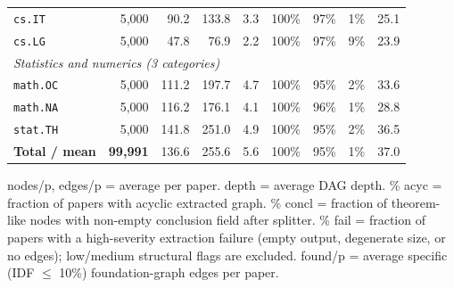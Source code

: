 \begin{table}[h]
\begin{tabular}{@{}lrrrrrrrr@{}}
\texttt{cs.IT} & 5{,}000 & 90.2 & 133.8 & 3.3 & 100\% & 97\% & 1\% & 25.1 \\
\texttt{cs.LG} & 5{,}000 & 47.8 & 76.9 & 2.2 & 100\% & 97\% & 9\% & 23.9 \\
\midrule
\multicolumn{9}{l}{\textit{Statistics and numerics (3 categories)}} \\
\texttt{math.OC} & 5{,}000 & 111.2 & 197.7 & 4.7 & 100\% & 95\% & 2\% & 33.6 \\
\texttt{math.NA} & 5{,}000 & 116.2 & 176.1 & 4.1 & 100\% & 96\% & 1\% & 28.8 \\
\texttt{stat.TH} & 5{,}000 & 141.8 & 251.0 & 4.9 & 100\% & 95\% & 2\% & 36.5 \\
\midrule
\textbf{Total / mean} & \textbf{99{,}991} & 136.6 & 255.6 & 5.6 & 100\% & 95\% & 1\% & 37.0 \\
\bottomrule
\end{tabular}

\vspace{0.4em}
\footnotesize
nodes/p, edges/p = average per paper. depth = average DAG depth. \% acyc = fraction of papers with acyclic extracted graph. \% concl = fraction of theorem-like nodes with non-empty conclusion field after splitter. \% fail = fraction of papers with a high-severity extraction failure (empty output, degenerate size, or no edges); low/medium structural flags are excluded. found/p = average specific (IDF $\leq$ 10\%) foundation-graph edges per paper.
\end{table}
